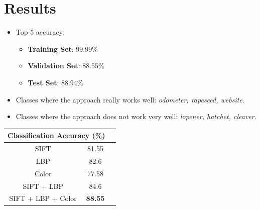 \documentclass[12pt]{article}
\begin{document}
\section{Results}
\begin{itemize}
\item Top-5 accuracy:
\begin{itemize}
\item \textbf{Training Set}: 99.99\%
\item \textbf{Validation Set}: 88.55\%
\item \textbf{Test Set}: 88.94\%
\end{itemize}
\item Classes where the approach really works well: \textit{odometer, rapeseed, website}.
\item Classes where the approach does not work very well: \textit{lopener, hatchet, cleaver}.
\end{itemize}

\begin{center}
\begin{tabular}[]{| c | c | c | }
\hline
\multicolumn{2}{|c|}{\textbf{Classification Accuracy} (\%)} \\
\hline
SIFT & 81.55\\
\hline
LBP & 82.6\\
\hline
Color & 77.58\\
\hline
SIFT + LBP & 84.6\\
\hline
SIFT + LBP + Color & \textbf{88.55}\\
\hline
\end{tabular}
\end{center}



\end{document}
